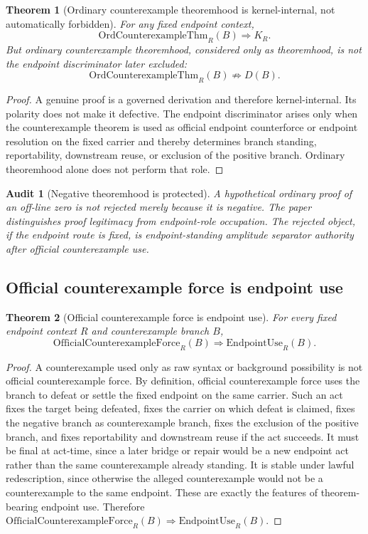 \documentclass[11pt]{article}
\newtheorem{theorem}{Theorem}[section]
\newtheorem{audit}{Audit}[section]
\newcommand{\EndpointUse}{\mathrm{EndpointUse}}
\newcommand{\OrdCxThm}{\mathrm{OrdCounterexampleThm}}
\newcommand{\OfficialCxForce}{\mathrm{OfficialCounterexampleForce}}
\begin{document}
\begin{theorem}[Ordinary counterexample theoremhood is kernel-internal, not automatically forbidden]
For any fixed endpoint context,
\[
\OrdCxThm_R(B)\Rightarrow K_R.
\]
But ordinary counterexample theoremhood, considered only as theoremhood, is not the endpoint discriminator later excluded:
\[
\OrdCxThm_R(B)\not\Rightarrow D(B).
\]
\end{theorem}

\begin{proof}
A genuine proof is a governed derivation and therefore kernel-internal. Its polarity does not make it defective. The endpoint discriminator arises only when the counterexample theorem is used as official endpoint counterforce or endpoint resolution on the fixed carrier and thereby determines branch standing, reportability, downstream reuse, or exclusion of the positive branch. Ordinary theoremhood alone does not perform that role.
\end{proof}

\begin{audit}[Negative theoremhood is protected]
A hypothetical ordinary proof of an off-line zero is not rejected merely because it is negative. The paper distinguishes proof legitimacy from endpoint-role occupation. The rejected object, if the endpoint route is fixed, is endpoint-standing amplitude separator authority after official counterexample use.
\end{audit}

\subsection{Official counterexample force is endpoint use}

\begin{theorem}[Official counterexample force is endpoint use]\label{thm:official-counterexample-force-endpoint-use}
For every fixed endpoint context \(R\) and counterexample branch \(B\),
\[
\OfficialCxForce_R(B)\Rightarrow \EndpointUse_R(B).
\]
\end{theorem}

\begin{proof}
A counterexample used only as raw syntax or background possibility is not official counterexample force. By definition, official counterexample force uses the branch to defeat or settle the fixed endpoint on the same carrier. Such an act fixes the target being defeated, fixes the carrier on which defeat is claimed, fixes the negative branch as counterexample branch, fixes the exclusion of the positive branch, and fixes reportability and downstream reuse if the act succeeds. It must be final at act-time, since a later bridge or repair would be a new endpoint act rather than the same counterexample already standing. It is stable under lawful redescription, since otherwise the alleged counterexample would not be a counterexample to the same endpoint. These are exactly the features of theorem-bearing endpoint use. Therefore \(\OfficialCxForce_R(B)\Rightarrow\EndpointUse_R(B)\).
\end{proof}
\end{document}
